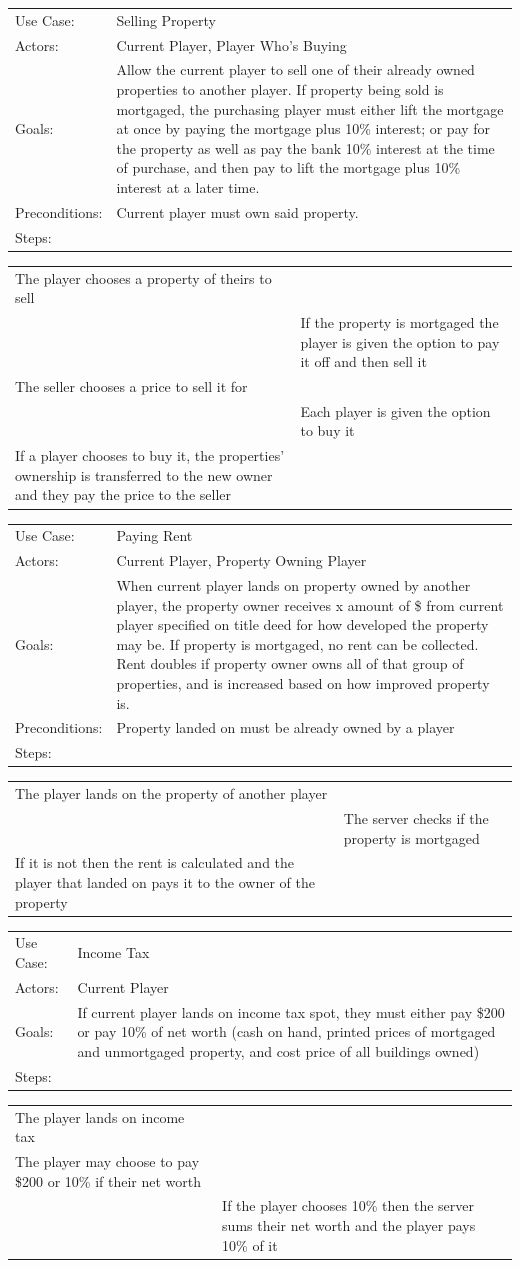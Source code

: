 \documentclass[10pt,letterpaper]{article}
\newcommand{\usecasetwocol}[1]{
\begin{center}
	\begin{tabularx}{0.8\textwidth}{| X X |}
		\hline
		#1 \\
		\hline
	\end{tabularx}
\end{center}
}
\newcommand{\usecasedescription}[1]{
\begin{center}
	\begin{tabularx}{0.8\textwidth}{l X}
		#1
	\end{tabularx}
\end{center}
}
\newcommand{\usecase}[2]{
\usecasedescription{#1}
\usecasetwocol{#2}
}
\begin{document}
\usecase{Use Case: & Selling Property \\
	Actors: & Current Player, Player Who’s Buying \\
	Goals: & Allow the current player to sell one of their already owned properties to another player. If property being sold is mortgaged, the purchasing player must either lift the mortgage at	once by paying the mortgage plus 10\% interest; or pay for the property as well as pay the bank 10\% interest at the time of purchase, and then pay to lift the mortgage plus  10\% interest at a later time. \\
	Preconditions: & Current player must own said property. \\
	Steps: &  }{The player chooses a property of theirs to sell &\\
	&If the property is mortgaged the player is given the option to pay it off and then sell it \\
	The seller chooses a price to sell it for& \\
	&Each player is given the option to buy it \\
	If a player chooses to buy it, the properties’ ownership is transferred to the new owner and they pay the price to the seller&}

\usecase{Use Case: & Paying Rent \\
	Actors: & Current Player, Property Owning Player \\
	Goals: & When current player lands on property owned by another player, the property owner receives x amount of \$ from current player specified on title deed for how developed the  property may be. If property is mortgaged, no rent can be collected. Rent doubles if property owner owns all of that group of properties, and is increased based on how improved property is. \\
	Preconditions: & Property landed on must be already owned by a player \\
	Steps: &  }{The player lands on the property of another player & \\
	&The server checks if the property is mortgaged \\
	If it is not then the rent is calculated and the player that landed on pays it to the owner of the property&}

\usecase{Use Case: & Income Tax \\
	Actors: & Current Player \\
	Goals: & If current player lands on income tax spot, they must either pay \$200 or pay 10\% of net worth (cash on hand, printed prices of mortgaged and unmortgaged property, and cost  price of all buildings owned) \\
	Steps: &  }{The player lands on income tax &\\
	The player may choose to pay \$200 or 10\% if their net worth &\\
	&If the player chooses 10\% then the server sums their net worth and the player pays 10\% of it}
\end{document}
